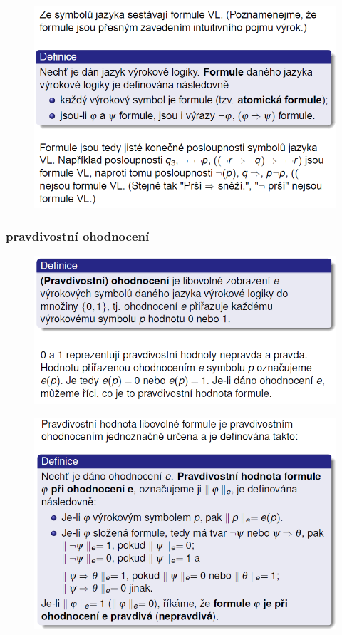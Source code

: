 \documentclass[10pt,a4paper]{article}
\theoremstyle{note}
\begin{document}
			\begin{figure}[!h]
			\centering
			\includegraphics[width=13cm]{img/formuleVL.png}
			\end{figure}
 		\newpage
		\subsubsection{pravdivostní ohodnocení}

			\begin{figure}[!h]
			\centering
			\includegraphics[width=13cm]{img/pravdivostniOhodnoceniVL.png}
			\end{figure}

			\begin{figure}[!h]
			\centering
			\includegraphics[width=13cm]{img/ohodnoceniFormule.png}
			\end{figure}
\end{document}
